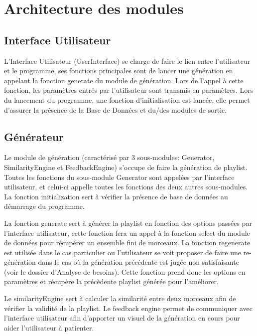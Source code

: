 
\section{Architecture des modules}
\label{archi:modules}

\subsection{Interface Utilisateur}
\label{archi:modules:iu}

L'Interface Utilisateur (UserInterface) se charge de faire le lien entre
l'utilisateur et le programme, ses fonctions principales sont de lancer une
génération en appelant la fonction generate du module de génération. Lors
de l'appel à cette fonction, les paramètres entrés par l'utilisateur sont
transmis en paramètres. Lors du lancement du programme, une fonction
d'initialisation est lancée, elle permet d'assurer la présence de la Base de
Données et du/des modules de sortie.

\subsection{Générateur}
\label{archi:modules:generateur}

Le module de génération (caractérisé par 3 sous-modules: Generator, 
SimilarityEngine et FeedbackEngine) s'occupe de faire la génération de
playlist. Toutes les fonctions du sous-module Generator sont appelées par
l'interface utilisateur, et celui-ci appelle toutes les fonctions des deux
autres sous-modules. La fonction initialization sert à vérifier la présence de
base de données au démarrage du programme. 

La fonction generate sert à générer la playlist en fonction des options passées 
par l'interface utilisateur, cette fonction fera un appel à la fonction
select du module de données pour récupérer un ensemble fini de morceaux. La 
fonction regenerate est utilisée dans le cas particulier ou l'utilisateur se 
voit proposer de faire une re-génération dans le cas où la génération précédente 
est jugée non satisfaisante (voir le dossier d'Analyse de besoins). Cette 
fonction prend donc les options en paramètres et récupère la précèdente playlist 
générée pour l'améliorer.

Le similarityEngine sert à calculer la similarité entre deux 
morceaux afin de vérifier la validité de la playlist. Le feedback engine 
permet de communiquer avec l'interface utilisateur afin d'apporter un visuel 
de la génération en cours pour aider l'utilisateur à patienter.

